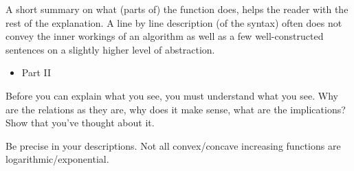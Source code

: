 A short summary on what (parts of) the function does, helps the reader
with the rest of the explanation. A line by line description (of the
syntax) often does not convey the inner workings of an algorithm as
well as a few well-constructed sentences on a slightly higher level of
abstraction.

\begin{itemize}
\item Part II
\end{itemize}

Before you can explain what you see, you must understand what you see.
Why are the relations as they are, why does it make sense, what are
the implications? Show that you've thought about it.

Be precise in your descriptions. Not all convex/concave increasing
functions are logarithmic/exponential.


